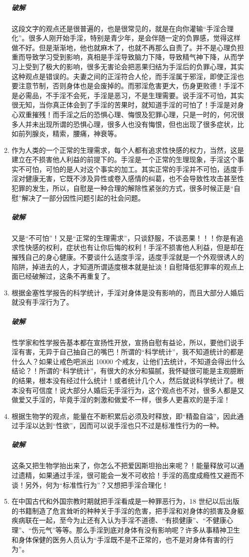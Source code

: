 \documentclass{ctexart}
\begin{document}
\begin{enumerate}
    \subparagraph{破解} 这段文字的观点还是很普遍的，也是很常见的，就是在向你灌输“手淫合理化”。很多人刚开始手淫，特别是青少年，是会伴随一定的负罪感，觉得这样做不好。但是渐渐地，他也就麻木了，也就不再那么自责了。并不是心理负担重而导致学习受到影响，真相是手淫导致脑力下降，导致精气神下降，从而学习上受到了极大的影响，很多无害论会把恶果归结为手淫后的负罪心理，其实这种观点是错误的。夫妻之间的正淫符合人伦，而手淫属于邪淫，即使正淫也要注意节制，否则身体也是会废掉的。而邪淫危害更大，伤身更败德！手淫不是必需品，不手淫不会死，手淫是恶习，不是生理需要。说手淫不可怕，其实很无知，当你真正体会到了手淫的苦果时，就知道手淫的可怕了！手淫是对身心双重摧残！而手淫之后的恐惧心理、悔恨及犯罪心理，只是一时的，何况很多人并未出现所谓的恐惧心理，很多人也没有悔恨，但也出现了很多症状，比如前列腺炎，精索，腰痛，神衰等。
    \item 作为人类的一个正常的生理需求，每个人都有追求性快感的权力，当然，这是建立在不损害他人利益的前提下的。手淫是一个正常的生理现象，手淫这个事实不可怕，可怕的是人对这个事实的加工。其实正常的手淫并不可怕，适度手淫对健康无害，它既不涉及异性或卷入感情的纠葛，也不会导致性攻击甚至性犯罪的发生，所以，自慰是一种合理的解除性紧张的方式，很多时候正是“自慰”解决了一部分因性问题引起的社会问题。
    \subparagraph{破解} 又是“不可怕”！又是“正常的生理需求”，只谈舒服，不谈恶果！！！你是有追求性快感的权利，症状也有让你后悔的权利！手淫不损害他人利益，但是却在摧残自己的身心健康。不要谈什么适度手淫，适度手淫就是一个外观很诱人的陷阱，掉进去的人，才知道所谓适度根本就是扯淡！自慰降低犯罪率的观点上面已经破解过，这条不再重复了。
    \item 根据金塞性学报告的科学统计，手淫对身体是没有影响的，而且大部分人婚后就没有手淫行为了。
    \subparagraph{破解} 性学家和性学报告基本都在宣扬性开放，宣扬自慰有益论，所以，要他们说手淫有害，无异于自己抽自己的嘴巴！所谓的“科学统计”，我不知道统计的都是什么人？如果让戒色吧派出 10000 个戒友，让他们去统计，不知道会得出什么结论？！所谓的“科学统计”，有很大的水分和猫腻，我怀疑很可能是主观臆断的结果，根本没有经过什么统计！或者统计几个人，然后就说科学统计了。根本没有可信度！说大部分人婚后无手淫行为，这个观点也不对，很多人都是又做爱又手淫的，毕竟手淫的刺激和做爱不一样，很多人更喜欢的是手淫！
    \item 根据生物学的观点，能量在不断积累后必须及时释放，即“精盈自溢”，因此通过手淫以达到“性欲”，因而可以说手淫也只不过是标准性行为的一种。
    \subparagraph{破解} 这条又把生物学抬出来了，你怎么不把爱因斯坦抬出来呢？！能量释放可以通过遗精，如果通过手淫，很可能会一发不可收拾！手淫的高度成瘾性又避而不谈！另外，何为“标准性行为”？又想把手淫合理化！
    \item 在中国古代和外国宗教时期就把手淫看成是一种罪恶行为，18 世纪以后出版的书籍制造了危言耸听的种种关于手淫的危害，把手淫和对身体的损害及身躯疾病联在一起，至今为止还有入认为手淫不道德、“有损健康”、“不健康心理”、“伤元气”等等。那么手淫到底对身体有没有影响呢？许多从事精神卫生和身体保健的医务人员认为“手淫既不是不正常的，也不是对身体有害的行为”。

\end{enumerate}
\end{document}
